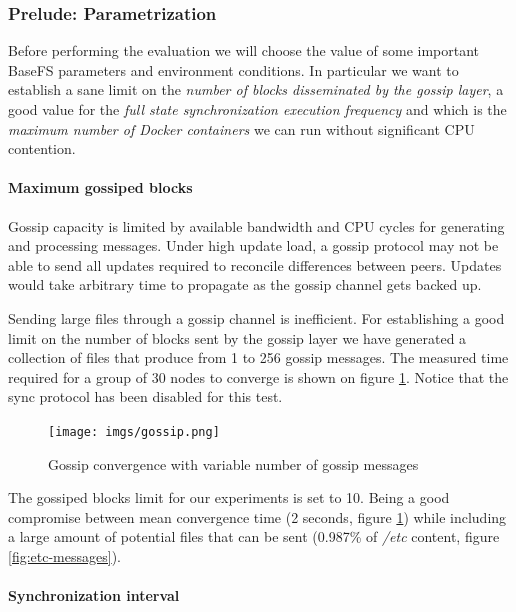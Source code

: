 \documentclass{sig-alternate}
\begin{document}
\subsubsection{Prelude: Parametrization}

Before performing the evaluation we will choose the value of some important BaseFS parameters and environment conditions. In particular we want to establish a sane limit on the \textit{number of blocks disseminated by the gossip layer}, a good value for the \textit{full state synchronization execution frequency} and which is the \textit{maximum number of Docker containers} we can run without significant CPU contention.


\paragraph{Maximum gossiped blocks}

Gossip capacity is limited by available bandwidth and CPU cycles for generating and processing messages. Under high update load, a gossip protocol may not be able to send all updates required to reconcile differences between peers. Updates would take arbitrary time to propagate as the gossip channel gets backed up. \cite{van2008efficient}

Sending large files through a gossip channel is inefficient. For establishing a good limit on the number of blocks sent by the gossip layer we have generated a collection of files that produce from 1 to 256 gossip messages. The measured time required for a group of 30 nodes to converge is shown on figure \ref{fig:gossip}. Notice that the sync protocol has been disabled for this test.

\begin{figure}
\centering
\texttt{[image: imgs/gossip.png]}
\caption{Gossip convergence with variable number of gossip messages}
\label{fig:gossip}
\end{figure}

The gossiped blocks limit for our experiments is set to 10. Being a good compromise between mean convergence time (2 seconds, figure \ref{fig:gossip}) while including a large amount of potential files that can be sent (0.987\% of \textit{/etc} content, figure   \ref{fig:etc-messages}).


\paragraph{Synchronization interval}
\end{document}
